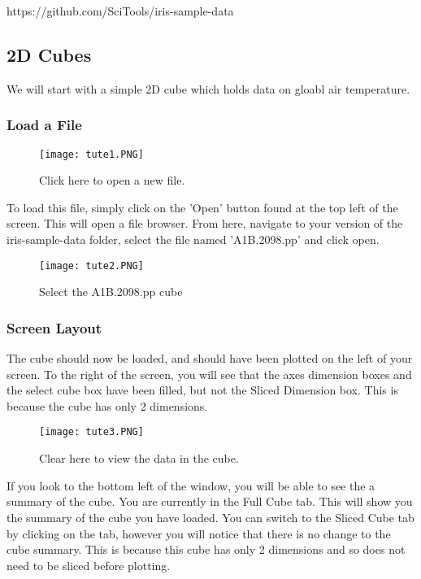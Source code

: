 \documentclass[a4paper,12pt]{article}
\begin{document}
https://github.com/SciTools/iris-sample-data

\subsection{2D Cubes}

We will start with a simple 2D cube which holds data on gloabl air temperature.

\subsubsection{Load a File}

\begin{figure}[H]
\centering{}
\texttt{[image: tute1.PNG]}
\caption{Click here to open a new file.}
\label{overflow}
\end{figure}

To load this file, simply click on the 'Open' button found at the top left
of the screen. This will open a file browser. From here, navigate to your
version of the iris-sample-data folder, select the file named
'A1B.2098.pp' and click open.

\begin{figure}[H]
\centering{}
\texttt{[image: tute2.PNG]}
\caption{Select the A1B.2098.pp cube}
\label{overflow}
\end{figure}

\subsubsection{Screen Layout}

The cube should now be loaded, and should have been plotted on the left of
your screen. To the right of the screen, you will see that
the axes dimension boxes and the select cube box have been filled, but not the
Sliced Dimension box. This is because the cube has only 2 dimensions.

\begin{figure}[H]
\centering
\texttt{[image: tute3.PNG]}
\caption{Clear here to view the data in the cube.}
\label{overflow}
\end{figure}

If you look to the bottom left of the window, you will be able to see the a
summary of the cube. You are currently in the Full Cube tab. This will show
you the summary of the cube you have loaded. You can switch to the Sliced Cube
tab by clicking on the tab, however you will notice that there is no change to
the cube summary. This is because this cube has only 2 dimensions and so does
not need to be sliced before plotting.
\end{document}
